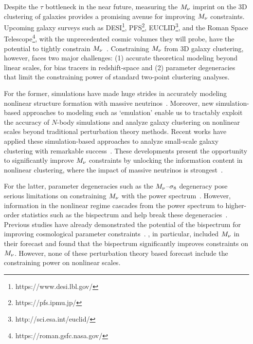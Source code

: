 Despite the $\tau$ bottleneck in the near future, measuring the $M_\nu$ imprint 
on the 3D clustering of galaxies provides a promising avenue for improving $M_\nu$ constraints. 
Upcoming galaxy surveys such as DESI\footnote{https://www.desi.lbl.gov/}, 
PFS\footnote{https://pfs.ipmu.jp/}, EUCLID\footnote{http://sci.esa.int/euclid/}, 
and the Roman Space Telescope\footnote{https://roman.gsfc.nasa.gov/}, 
with the unprecedented cosmic volumes they will probe, 
have the potential to tightly constrain 
$M_\nu$~\citep{audren2013, font-ribera2014, petracca2016, sartoris2016, boyle2018}.
Constraining $M_\nu$ from 3D galaxy clustering, however, faces two major 
challenges: (1) accurate theoretical modeling beyond linear scales, for bias
tracers in redshift-space and (2) parameter degeneracies that limit the
constraining power of standard two-point clustering analyses. 

For the former, simulations have made huge strides in accurately modeling 
nonlinear structure formation with massive neutrinos~\citep[\eg][]{brandbyge2008, 
villaescusa-navarro2013, castorina2015, adamek2017, emberson2017, banerjee2018, 
villaescusa-navarro2018, villaescusa-navarro2019, yoshikawa2020}. Moreover, new simulation-based
approaches to modeling such as `emulation' enable us to tractably exploit the accuracy of 
$N$-body simulations and analyze galaxy clustering on nonlinear scales beyond
traditional perturbation theory methods. Recent works have applied
these simulation-based approaches to analyze small-scale galaxy clustering with
remarkable success~\citep[\eg][]{heitmann2009, kwan2015, euclidcollaboration2018, lange2019, zhai2019, wibking2019}. 
These developments present the opportunity to significantly improve $M_\nu$
constraints by unlocking the information content in nonlinear clustering, where
the impact of massive neutrinos is strongest~\citep[\eg][]{brandbyge2008,
saito2008, wong2008, saito2009, viel2010, agarwal2011, marulli2011, bird2012,
castorina2015, banerjee2016, upadhye2016, banerjee2020, allys2020, massara2020,
uhlemann2020}.

For the latter, parameter degeneracies such as the $M_\nu$--$\sigma_8$
degeneracy pose serious limitations on constraining 
$M_\nu$ with the power spectrum~\citep{villaescusa-navarro2018}. However, 
information in the nonlinear regime cascades
from the power spectrum to higher-order statistics such as the bispectrum 
and help break these degeneracies~\citep{hahn2020}. Previous studies have already demonstrated the
potential of the bispectrum for improving cosmological parameter
constraints~\citep{sefusatti2005, sefusatti2006, chan2017, yankelevich2019,
agarwal2020}.
\cite{chudaykin2019}, in particular, included $M_\nu$ in their forecast and
found that the bispectrum significantly improves constraints on $M_\nu$.
However, none of these perturbation theory based forecast include the
constraining power on nonlinear scales. 

